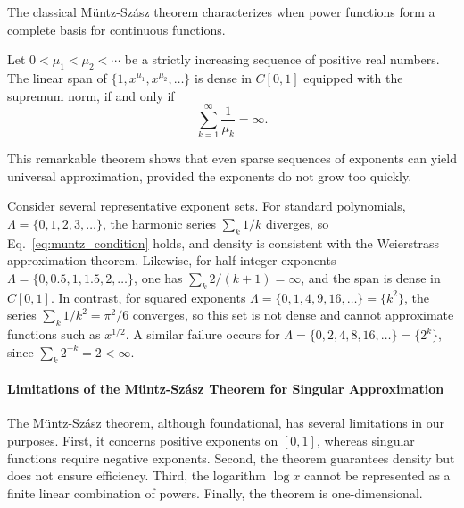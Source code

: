 \documentclass[twoside,11pt]{article}
\renewcommand{\eqref}[1]{Eq.~\ref{#1}}
\begin{document}
The classical Müntz-Szász theorem characterizes when power functions form a complete basis for continuous functions.

\begin{theorem}
	\label{thm:muntz_szasz}
	Let $0 < \mu_1 < \mu_2 < \cdots$ be a strictly increasing sequence of positive real numbers. The linear span of $\{1, x^{\mu_1}, x^{\mu_2}, \ldots\}$ is dense in $C[0,1]$ equipped with the supremum norm, if and only if
	\begin{equation}
		\sum_{k=1}^\infty \frac{1}{\mu_k} = \infty.
		\label{eq:muntz_condition}
	\end{equation}
\end{theorem}

This remarkable theorem shows that even sparse sequences of exponents can yield universal approximation, provided the exponents do not grow too quickly.

\begin{example}
	\label{ex:muntz_examples}
	Consider several representative exponent sets. For standard polynomials, $\Lambda = \{0, 1, 2, 3, \ldots\}$, the harmonic series $\sum_k 1/k$ diverges, so \eqref{eq:muntz_condition} holds, and density is consistent with the Weierstrass approximation theorem. Likewise, for half-integer exponents $\Lambda = \{0, 0.5, 1, 1.5, 2, \ldots\}$, one has $\sum_k 2/(k+1) = \infty$, and the span is dense in $C[0,1]$. In contrast, for squared exponents $\Lambda = \{0, 1, 4, 9, 16, \ldots\} = \{k^2\}$, the series $\sum_k 1/k^2 = \pi^2/6$ converges, so this set is not dense and cannot approximate functions such as $x^{1/2}$. A similar failure occurs for $\Lambda = \{0, 2, 4, 8, 16, \ldots\} = \{2^k\}$, since $\sum_k 2^{-k} = 2 < \infty$.
\end{example}

\paragraph{Limitations of the Müntz-Szász Theorem for Singular Approximation} The Müntz-Szász theorem, although foundational, has several limitations in our purposes. First, it concerns positive exponents on $[0,1]$, whereas singular functions require negative exponents. Second, the theorem guarantees density but does not ensure efficiency. Third, the logarithm $\log x$ cannot be represented as a finite linear combination of powers. Finally, the theorem is one-dimensional.
\end{document}
